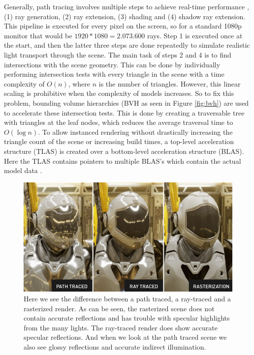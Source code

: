 Generally, path tracing involves multiple steps to achieve real-time performance \cite{laine2013megakernels}, (1) ray generation, (2) ray extension, (3) shading and (4) shadow ray extension. This pipeline is executed for every pixel on the screen, so for a standard 1080p monitor that would be $1920*1080=2.073.600$ rays. Step 1 is executed once at the start, and then the latter three steps are done repeatedly to simulate realistic light transport through the scene. The main task of steps 2 and 4 is to find intersections with the scene geometry. This can be done by individually performing intersection tests with every triangle in the scene with a time complexity of $O(n)$, where $n$ is the number of triangles. However, this linear scaling is prohibitive when the complexity of models increases. So to fix this problem, bounding volume hierarchies (BVH as seen in Figure \ref{fig:bvh}) are used to accelerate these intersection tests. This is done by creating a traversable tree with triangles at the leaf nodes, which reduces the average traversal time to  $O(\log n)$. To allow instanced rendering without drastically increasing the triangle count of the scene or increasing build times, a top-level acceleration structure (TLAS) is created over a bottom-level acceleration structure (BLAS). Here the TLAS contains pointers to multiple BLAS's which contain the actual model data \cite{VulkanAccelerationStructures}.

\begin{figure}
    \centering
    \includegraphics[width=\linewidth]{figures/nvidia_ray_path_rasterization.png}
    \caption{Here we see the difference between a path traced, a ray-traced and a rasterized render. As can be seen, the rasterized scene does not contain accurate reflections and has trouble with specular highlights from the many lights. The ray-traced render does show accurate specular reflections. And when we look at the path traced scene we also see glossy reflections and accurate indirect illumination. \cite{NVIDIAPathRayRaster}}
    \label{fig:path_ray_raster}
\end{figure}


